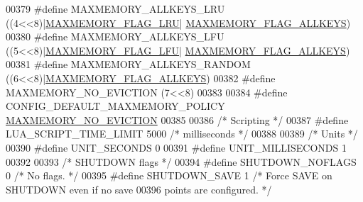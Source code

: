 \begin{DoxyCode}
{{{{{{00379 \textcolor{preprocessor}{#}\textcolor{preprocessor}{define} \textcolor{preprocessor}{MAXMEMORY\_ALLKEYS\_LRU} \textcolor{preprocessor}{(}\textcolor{preprocessor}{(}4\textcolor{preprocessor}{<<}8\textcolor{preprocessor}{)}\textcolor{preprocessor}{|}\hyperlink{server_8h_a9f9503e7c7ba52df66b097c2b0b4c6d0}{MAXMEMORY\_FLAG\_LRU}\textcolor{preprocessor}{|}
      \hyperlink{server_8h_a6fccff10a0d37e23fb8114d5c87737d0}{MAXMEMORY\_FLAG\_ALLKEYS}\textcolor{preprocessor}{)}
00380 \textcolor{preprocessor}{#}\textcolor{preprocessor}{define} \textcolor{preprocessor}{MAXMEMORY\_ALLKEYS\_LFU} \textcolor{preprocessor}{(}\textcolor{preprocessor}{(}5\textcolor{preprocessor}{<<}8\textcolor{preprocessor}{)}\textcolor{preprocessor}{|}\hyperlink{server_8h_aac2d3ad7a604f87e06e25233dbd01c9b}{MAXMEMORY\_FLAG\_LFU}\textcolor{preprocessor}{|}
      \hyperlink{server_8h_a6fccff10a0d37e23fb8114d5c87737d0}{MAXMEMORY\_FLAG\_ALLKEYS}\textcolor{preprocessor}{)}
00381 \textcolor{preprocessor}{#}\textcolor{preprocessor}{define} \textcolor{preprocessor}{MAXMEMORY\_ALLKEYS\_RANDOM} \textcolor{preprocessor}{(}\textcolor{preprocessor}{(}6\textcolor{preprocessor}{<<}8\textcolor{preprocessor}{)}\textcolor{preprocessor}{|}\hyperlink{server_8h_a6fccff10a0d37e23fb8114d5c87737d0}{MAXMEMORY\_FLAG\_ALLKEYS}\textcolor{preprocessor}{)}
00382 \textcolor{preprocessor}{#}\textcolor{preprocessor}{define} \textcolor{preprocessor}{MAXMEMORY\_NO\_EVICTION} \textcolor{preprocessor}{(}7\textcolor{preprocessor}{<<}8\textcolor{preprocessor}{)}
00383 
00384 \textcolor{preprocessor}{#}\textcolor{preprocessor}{define} \textcolor{preprocessor}{CONFIG\_DEFAULT\_MAXMEMORY\_POLICY} \hyperlink{server_8h_a418e5a222cf659c003df77830f1ae343}{MAXMEMORY\_NO\_EVICTION}
00385 
00386 \textcolor{comment}{/* Scripting */}
00387 \textcolor{preprocessor}{#}\textcolor{preprocessor}{define} \textcolor{preprocessor}{LUA\_SCRIPT\_TIME\_LIMIT} 5000 \textcolor{comment}{/* milliseconds */}
00388 
00389 \textcolor{comment}{/* Units */}
00390 \textcolor{preprocessor}{#}\textcolor{preprocessor}{define} \textcolor{preprocessor}{UNIT\_SECONDS} 0
00391 \textcolor{preprocessor}{#}\textcolor{preprocessor}{define} \textcolor{preprocessor}{UNIT\_MILLISECONDS} 1
00392 
00393 \textcolor{comment}{/* SHUTDOWN flags */}
00394 \textcolor{preprocessor}{#}\textcolor{preprocessor}{define} \textcolor{preprocessor}{SHUTDOWN\_NOFLAGS} 0      \textcolor{comment}{/* No flags. */}
00395 \textcolor{preprocessor}{#}\textcolor{preprocessor}{define} \textcolor{preprocessor}{SHUTDOWN\_SAVE} 1         \textcolor{comment}{/* Force SAVE on SHUTDOWN even if no save}
00396 \textcolor{comment}{                                   points are configured. */}
}}}}}}
\end{DoxyCode}
